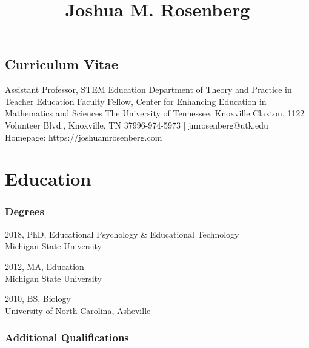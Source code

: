 \documentclass[
  14,
]{article}
\title{Joshua M. Rosenberg\vspace{-3em}}
\author{}
\date{}
\begin{document}
\maketitle
\thispagestyle{empty}

\begin{center}

\section{Curriculum Vitae}\label{curriculum-vitae}

Assistant Professor, STEM Education\linebreak
Department of Theory and Practice in Teacher Education\linebreak
Faculty Fellow, Center for Enhancing Education in Mathematics and Sciences\linebreak
The University of Tennessee, Knoxville Claxton, 1122 Volunteer Blvd., Knoxville, TN 37996-974-5973 | jmrosenberg@utk.edu\linebreak
Homepage: https://joshuamrosenberg.com\linebreak
\end{center}

\hypertarget{education}{%
\section{Education}\label{education}}

\hypertarget{degrees}{%
\subsubsection{Degrees}\label{degrees}}

2018, PhD, Educational Psychology \& Educational Technology\\
Michigan State University

2012, MA, Education\\
Michigan State University

2010, BS, Biology\\
University of North Carolina, Asheville

\hypertarget{additional-qualifications}{%
\subsubsection{Additional
Qualifications}\label{additional-qualifications}}
\end{document}
